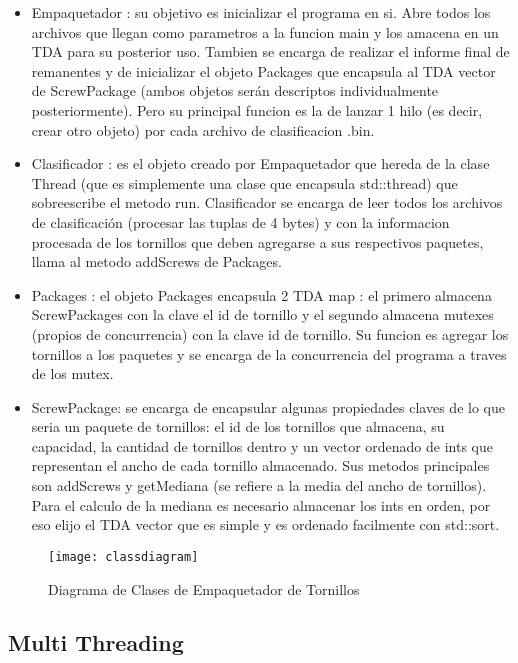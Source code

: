 \documentclass[a4paper,12pt]{report}
\begin{document}
\begin{itemize}

\item Empaquetador : su objetivo es inicializar el programa en si. Abre todos los archivos que llegan como parametros a la funcion main y los amacena en un TDA para su posterior uso. Tambien se encarga de realizar el informe final de remanentes y de inicializar el objeto Packages que encapsula al TDA vector de ScrewPackage (ambos objetos ser\'an descriptos individualmente posteriormente). Pero su principal funcion es la de lanzar 1 hilo (es decir, crear otro objeto) por cada archivo de clasificacion .bin.

\item Clasificador : es el objeto creado por Empaquetador que hereda de la clase Thread (que es simplemente una clase que encapsula std::thread) que sobreescribe el metodo run. Clasificador se encarga de leer todos los archivos de clasificaci\'on (procesar las tuplas de 4 bytes) y con la informacion procesada de los tornillos que deben agregarse a sus respectivos paquetes, llama al metodo addScrews de Packages.

\item Packages : el objeto Packages encapsula 2 TDA map : el primero almacena ScrewPackages con la clave el id de tornillo y el segundo almacena mutexes (propios de concurrencia) con la clave id de tornillo. Su funcion es agregar los tornillos a los paquetes y se encarga de la concurrencia del programa a traves de los mutex.

\item ScrewPackage:  se encarga de encapsular algunas propiedades claves de lo que seria un paquete de tornillos: el id de los tornillos que almacena, su capacidad, la cantidad de tornillos dentro y un vector ordenado de ints que representan el ancho de cada tornillo almacenado. Sus metodos principales son addScrews y getMediana (se refiere a la media del ancho de tornillos). Para el calculo de la mediana es necesario almacenar los ints en orden, por eso elijo el TDA vector que es simple y es ordenado facilmente con std::sort.
 
\end{itemize}

\begin{figure}[h!]
\centering
\texttt{[image: classdiagram]}
\caption{Diagrama de Clases de Empaquetador de Tornillos}
\end{figure}

\subsection{Multi Threading}
\end{document}
